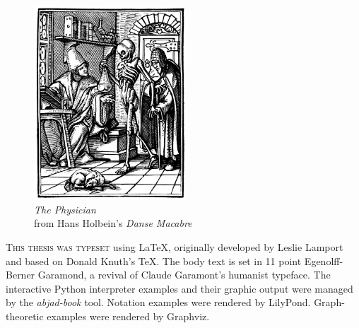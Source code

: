 \newpage

\begin{figure}
    \vspace{50pt}
    \centering
    \includegraphics[width=0.51\textwidth]{assets/holbein-physician.jpg}
    \\
    \emph{The Physician}
    \\
    from Hans Holbein's \emph{Danse Macabre}
\end{figure}

\begin{center}
\parbox{200pt}{\lettrine[lines=3,slope=-2pt,nindent=-4pt]{\textcolor{SchoolColor}{T}}{his
thesis was typeset} using \LaTeX, originally developed by Leslie Lamport and
based on Donald Knuth's \TeX. The body text is set in 11 point Egenolff-Berner
Garamond, a revival of Claude Garamont's humanist typeface. The interactive
Python interpreter examples and their graphic output were managed by the
\emph{abjad-book} tool. Notation examples were rendered by LilyPond.
Graph-theoretic examples were rendered by Graphviz. }
\end{center}